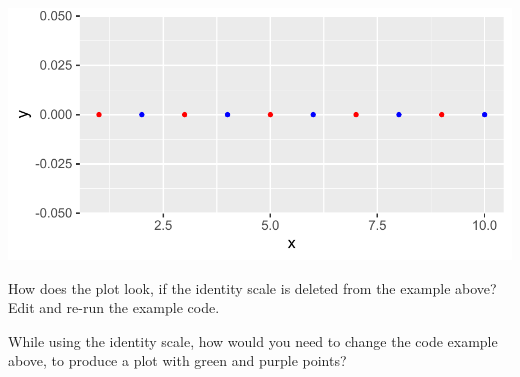\documentclass[krantz2]{krantz}\usepackage{knitr}
\begin{document}
\begin{knitrout}\footnotesize
{}\color{fgcolor}\begin{kframe}
\begin{alltt}
 \hlkwb{<-} \hlstd{(} \hlstd{=} \hlopt{:}\hlstd{,}  \hlstd{=} \hlstd{(}\hlstd{),}  \hlstd{=} \hlstd{(}\hlstd{(}\hlstd{,} \hlstd{),} \hlstd{))}

    \hlopt{+}
  \hlstd{()} \hlopt{+}
  \hlstd{()}
\end{alltt}
\end{kframe}

{\centering \includegraphics[width=.7\textwidth]{figure/pos-scale-color-10-1} 

}


\end{knitrout}

\begin{playground}
How does the plot look, if the identity scale is deleted from the example above? Edit and re-run the example code.

While using the identity scale, how would you need to change the code example above, to produce a plot with green and purple points?
\end{playground}
\end{document}
